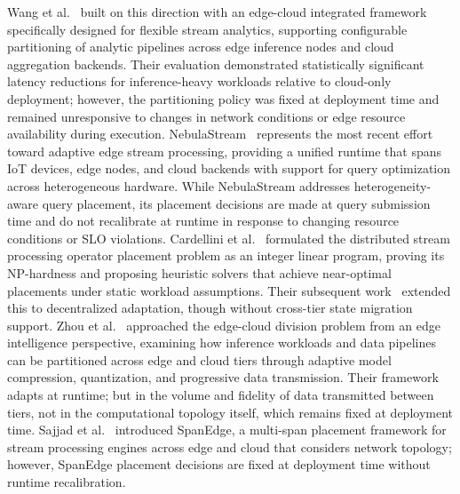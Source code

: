 \documentclass[preprint,review,12pt]{elsarticle}
\begin{document}
Wang et al.~\cite{wang2022edgecloud} built on this direction with an edge-cloud integrated framework specifically designed for flexible stream analytics, supporting configurable partitioning of analytic pipelines across edge inference nodes and cloud aggregation backends. Their evaluation demonstrated statistically significant latency reductions for inference-heavy workloads relative to cloud-only deployment; however, the partitioning policy was fixed at deployment time and remained unresponsive to changes in network conditions or edge resource availability during execution. NebulaStream~\cite{zeuch2020nebulastream} represents the most recent effort toward adaptive edge stream processing, providing a unified runtime that spans IoT devices, edge nodes, and cloud backends with support for query optimization across heterogeneous hardware. While NebulaStream addresses heterogeneity-aware query placement, its placement decisions are made at query submission time and do not recalibrate at runtime in response to changing resource conditions or SLO violations. Cardellini et al.~\cite{cardellini2016optimal} formulated the distributed stream processing operator placement problem as an integer linear program, proving its NP-hardness and proposing heuristic solvers that achieve near-optimal placements under static workload assumptions. Their subsequent work~\cite{cardellini2018decentralized} extended this to decentralized adaptation, though without cross-tier state migration support. Zhou et al.~\cite{zhou2019edge} approached the edge-cloud division problem from an edge intelligence perspective, examining how inference workloads and data pipelines can be partitioned across edge and cloud tiers through adaptive model compression, quantization, and progressive data transmission. Their framework adapts at runtime; but in the volume and fidelity of data transmitted between tiers, not in the computational topology itself, which remains fixed at deployment time. Sajjad et al.~\cite{sajjad2016spanedge} introduced SpanEdge, a multi-span placement framework for stream processing engines across edge and cloud that considers network topology; however, SpanEdge placement decisions are fixed at deployment time without runtime recalibration.
\end{document}
